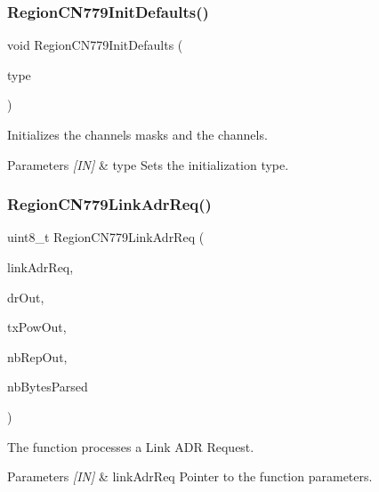 \subsubsection{\texorpdfstring{Region\+C\+N779\+Init\+Defaults()}{RegionCN779InitDefaults()}}
{\footnotesize\ttfamily void Region\+C\+N779\+Init\+Defaults (\begin{DoxyParamCaption}\item[{\hyperlink{group__REGION_gaddc73ae10673ec925724e7870363bda9}{Init\+Type\+\_\+t}}]{type }\end{DoxyParamCaption})}



Initializes the channels masks and the channels. 


\begin{DoxyParams}{Parameters}
{\em \mbox{[}\+I\+N\mbox{]}} & type Sets the initialization type. \\
\hline
\end{DoxyParams}
\mbox{\label{group__REGIONCN779_gae3bdb6e223de1fd6b72182eb278f3828}} 
\subsubsection{\texorpdfstring{Region\+C\+N779\+Link\+Adr\+Req()}{RegionCN779LinkAdrReq()}}
{\footnotesize\ttfamily uint8\+\_\+t Region\+C\+N779\+Link\+Adr\+Req (\begin{DoxyParamCaption}\item[{\hyperlink{group__REGION_gad4af503e8d4de1846129e26a799a1e8e}{Link\+Adr\+Req\+Params\+\_\+t} $\ast$}]{link\+Adr\+Req,  }\item[{int8\+\_\+t $\ast$}]{dr\+Out,  }\item[{int8\+\_\+t $\ast$}]{tx\+Pow\+Out,  }\item[{uint8\+\_\+t $\ast$}]{nb\+Rep\+Out,  }\item[{uint8\+\_\+t $\ast$}]{nb\+Bytes\+Parsed }\end{DoxyParamCaption})}



The function processes a Link A\+DR Request. 


\begin{DoxyParams}{Parameters}
{\em \mbox{[}\+I\+N\mbox{]}} & link\+Adr\+Req Pointer to the function parameters.\\
\hline
\end{DoxyParams}

